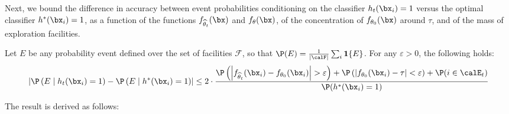 \documentclass[blindrev]{informs3noheader}
\begin{document}
Next, we bound the difference in accuracy between event probabilities conditioning on the classifier $h_t(\bx_i)=1$ versus the optimal classifier $h^*(\bx_i)=1$, as a function of the functions $f_{\widehat\theta_t}(\bx)$ and $f_{\theta}(\bx)$, of the concentration of $f_{\theta_0}(\bx)$ around $\tau$, and of the mass of exploration facilities.
\begin{lemma}\label{lem:bound_classification}
Let $E$ be any probability event defined over the set of facilities $\mathcal{F}$, so that $\P(E)=\frac{1}{|\calF|} \sum_i \bm{1}\{E\}$. For any $\varepsilon>0$, the following holds:
\[\left|\P\left(E \mid h_t(\bx_i)=1\right)- \P\left(E \mid h^*(\bx_i)=1\right)\right|\leq2\cdot\frac{\P\left( \left|f_{\widehat\theta_t}(\bx_i) - f_{\theta_0}(\bx_i)\right| > \varepsilon \right)+\P\left( \left|f_{\theta_0}(\bx_i) -\tau\right| < \varepsilon \right)+\P(i \in \calE_t)}{\P(h^*(\bx_i)=1)}\]
\end{lemma}
The result is derived as follows:
\end{document}
